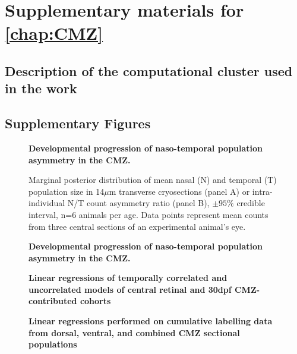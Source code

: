 \chapter{Supplementary materials for \autoref{chap:CMZ}}
\section{Description of the computational cluster used in the work}
\label{cluster}

\section{Supplementary Figures}

\begin{figure}[!h]
    \caption{{\bf Developmental progression of naso-temporal population asymmetry in the CMZ.}}
    \label{morphology}
\end{figure}

\begin{figure}[!h]
    \caption{{\bf Developmental progression of naso-temporal population asymmetry in the CMZ.}}
    Marginal posterior distribution of mean nasal (N) and temporal (T) population size in 14$\mu$m transverse cryosections (panel A) or intra-individual N/T count asymmetry ratio (panel B), $\pm 95\%$ credible interval, n=6 animals per age. Data points represent mean counts from three central sections of an experimental animal's eye. 
    \label{NTontology}
\end{figure}


\begin{figure}[!h]
    \caption{{\bf Linear regressions of temporally correlated and uncorrelated models of central retinal and 30dpf CMZ-contributed cohorts}}
    \label{a27linreg}
\end{figure}


\begin{figure}[!h]
    \caption{{\bf Linear regressions performed on cumulative labelling data from dorsal, ventral, and combined CMZ sectional populations}}
    \label{cumEdUlinreg}
\end{figure}
\FloatBarrier

